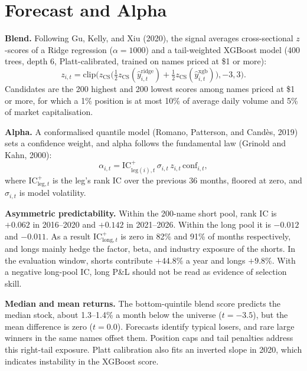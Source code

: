 \documentclass[10pt,twocolumn,letterpaper]{article}
\begin{document}
\section{Forecast and Alpha}

\textbf{Blend.} Following Gu, Kelly, and Xiu (2020), the signal averages cross-sectional $z$-scores of a Ridge regression ($\alpha = 1000$) and a tail-weighted XGBoost model (400 trees, depth 6, Platt-calibrated, trained on names priced at \$1 or more):
\begin{equation}
z_{i,t} = \mathrm{clip}\Big(z_{\text{CS}}\big(\tfrac{1}{2} z_{\text{CS}}(\hat{y}_{i,t}^{\text{ridge}}) + \tfrac{1}{2} z_{\text{CS}}(\hat{y}_{i,t}^{\text{xgb}})\big), -3, 3\Big). \label{eq:blend_z}
\end{equation}
Candidates are the 200 highest and 200 lowest scores among names priced at \$1 or more, for which a 1\% position is at most 10\% of average daily volume and 5\% of market capitalisation.

\textbf{Alpha.} A conformalised quantile model (Romano, Patterson, and Cand\`es, 2019) sets a confidence weight, and alpha follows the fundamental law (Grinold and Kahn, 2000):
\begin{equation}
\alpha_{i,t} = \mathrm{IC}^+_{\text{leg}(i),t}\,\sigma_{i,t}\,z_{i,t}\,\mathrm{conf}_{i,t}, \label{eq:gk_alpha}
\end{equation}
where $\mathrm{IC}^+_{\text{leg},t}$ is the leg's rank IC over the previous 36 months, floored at zero, and $\sigma_{i,t}$ is model volatility.

\textbf{Asymmetric predictability.} Within the 200-name short pool, rank IC is $+0.062$ in 2016--2020 and $+0.142$ in 2021--2026. Within the long pool it is $-0.012$ and $-0.011$. As a result $\mathrm{IC}^+_{\text{long},t}$ is zero in 82\% and 91\% of months respectively, and longs mainly hedge the factor, beta, and industry exposure of the shorts. In the evaluation window, shorts contribute $+44.8\%$ a year and longs $+9.8\%$. With a negative long-pool IC, long P\&L should not be read as evidence of selection skill.

\textbf{Median and mean returns.} The bottom-quintile blend score predicts the median stock, about 1.3--1.4\% a month below the universe ($t = -3.5$), but the mean difference is zero ($t = 0.0$). Forecasts identify typical losers, and rare large winners in the same names offset them. Position caps and tail penalties address this right-tail exposure. Platt calibration also fits an inverted slope in 2020, which indicates instability in the XGBoost score.
\end{document}
